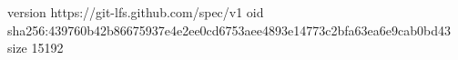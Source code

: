 version https://git-lfs.github.com/spec/v1
oid sha256:439760b42b86675937e4e2ee0cd6753aee4893e14773c2bfa63ea6e9cab0bd43
size 15192
